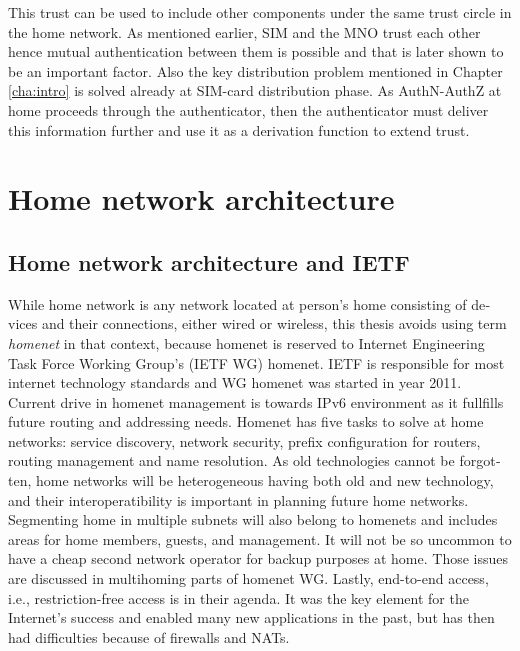\documentclass[12pt,a4paper,english]{tutthesis}
\begin{document}
\begin{otherlanguage}{english}
This trust can be used to include other components under the
same trust circle in the home network. As mentioned earlier,  SIM
and the MNO trust each other hence mutual authentication between them is
possible and that is later shown to be an important factor.  Also the
key distribution problem mentioned in Chapter \ref{cha:intro} is solved
already at SIM-card distribution phase.  As AuthN-AuthZ at home
proceeds through the authenticator, then the authenticator must
deliver this information further and use it as a derivation function
to extend trust.




\chapter{Home network architecture}
\label{sec-3}

\section{Home network architecture and IETF}
\label{sec-3-1}


While home network is any network located at person's home consisting
of devices and their connections, either wired or wireless,
this thesis avoids using term \emph{homenet} in that context,
because  homenet  is  reserved to 
Internet Engineering Task Force Working Group's (IETF
WG) homenet. IETF is responsible for  most internet technology standards and 
WG homenet was started in year 2011.
Current drive in homenet management is towards IPv6 environment
 as it fullfills future routing and addressing needs. 
Homenet has five tasks to solve at home networks: service discovery, network security, 
prefix configuration for routers, routing management and name
resolution\cite{homenet-charter}.
As old technologies cannot be forgotten, home networks will be heterogeneous having both
old and new technology, and their interoperatibility is important in
planning future home networks. 
Segmenting home in multiple subnets will also belong
to homenets and includes areas for home members, guests,
and management. It will not be so uncommon to have a cheap second
network operator for backup purposes at home. Those issues are
discussed in multihoming parts of homenet WG.
Lastly, end-to-end access, i.e., restriction-free access is in their agenda. 
It was the key element for the Internet's success and enabled many new
applications in the past, but has then had difficulties because of
firewalls and NATs.




\end{otherlanguage}
\end{document}
